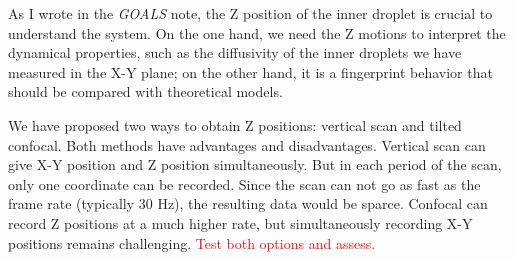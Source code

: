 \documentclass[onecolumn,aps, pre,amsmath,amssymb,longbibliography,12pt]{revtex4-2}
\begin{document}
As I wrote in the \textit{GOALS} note, the Z position of the inner droplet is crucial to understand the system.
On the one hand, we need the Z motions to interpret the dynamical properties, such as the diffusivity of the inner droplets we have measured in the X-Y plane;
on the other hand, it is a fingerprint behavior that should be compared with theoretical models.

We have proposed two ways to obtain Z positions: vertical scan and tilted confocal.
Both methods have advantages and disadvantages.
Vertical scan can give X-Y position and Z position simultaneously.
But in each period of the scan, only one coordinate can be recorded.
Since the scan can not go as fast as the frame rate (typically 30 Hz), the resulting data would be sparce.
Confocal can record Z positions at a much higher rate, but simultaneously recording X-Y positions remains challenging.
\textcolor{red}{Test both options and assess.}
\end{document}
